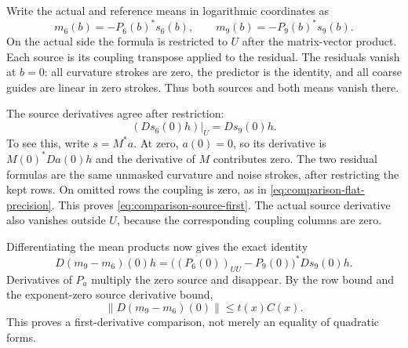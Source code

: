 Write the actual and reference means in logarithmic coordinates as
\[
              m_6(b)=-P_6(b)^*s_6(b),\qquad
              m_9(b)=-P_9(b)^*s_9(b).
\]
On the actual side the formula is restricted to $U$ after the
matrix-vector product. Each source is its coupling transpose
applied to the residual. The residuals vanish at $b=0$: all
curvature strokes are zero, the predictor is the identity, and
all coarse guides are linear in zero strokes. Thus both sources
and both means vanish there.

The source derivatives agree after restriction:
\begin{equation}\label{eq:comparison-source-first}
                         (Ds_6(0)h)|_U=Ds_9(0)h.
\end{equation}
To see this, write $s=M^*a$. At zero, $a(0)=0$, so its derivative
is $M(0)^*Da(0)h$ and the derivative of $M$ contributes zero.
The two residual formulas are the same unmasked curvature and
noise strokes, after restricting the kept rows. On omitted rows
the coupling is zero, as in
\eqref{eq:comparison-flat-precision}. This proves
\eqref{eq:comparison-source-first}. The actual source derivative
also vanishes outside $U$, because the corresponding coupling
columns are zero.

Differentiating the mean products now gives the exact identity
\begin{equation}\label{eq:comparison-mean-first}
 D(m_9-m_6)(0)h=
                  \bigl((P_6(0))_{UU}-P_9(0)\bigr)^*Ds_9(0)h.
\end{equation}
Derivatives of $P_a$ multiply the zero source and disappear.
By the row bound and the exponent-zero source derivative bound,
\[
          \|D(m_9-m_6)(0)\|\le t(x)C(x).
\]
This proves a first-derivative comparison, not merely an equality
of quadratic forms.

